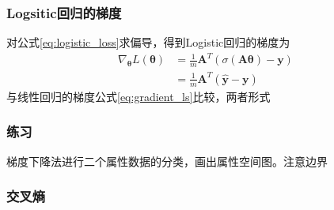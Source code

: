 \documentclass[14pt]{beamer}
\newcommand{\mat}[1]{\bm{#1}}
\renewcommand{\vec}[1]{\bm{#1}}
\newcommand{\MA}{\mat{A}}
\newcommand{\Vy}{\vec{y}}
\newcommand{\Vt}{\vec{\theta}}
\let\emph\relax %
\begin{document}
\begin{frame}
  \frametitle{Logsitic回归的梯度}
  对公式\ref{eq:logistic_loss}求偏导，得到Logistic回归的梯度为
  \begin{equation}
    \begin{split}
    \nabla_{\Vt}L(\Vt)&=\frac{1}{m}\MA^T(\sigma(\MA\Vt)-\Vy)\\
    &=\frac{1}{m}\MA^T(\hat{\Vy}-\Vy)
    \end{split}
  \end{equation}
  与线性回归的梯度公式\ref{eq:gradient_ls}比较，两者形式\emph{高度相似}

\end{frame}

\begin{frame}
  \frametitle{练习}
  梯度下降法进行二个属性数据的分类，画出属性空间图。注意边界
  

\end{frame}
\begin{frame}
  \frametitle{交叉熵}

  

\end{frame}
\end{document}
